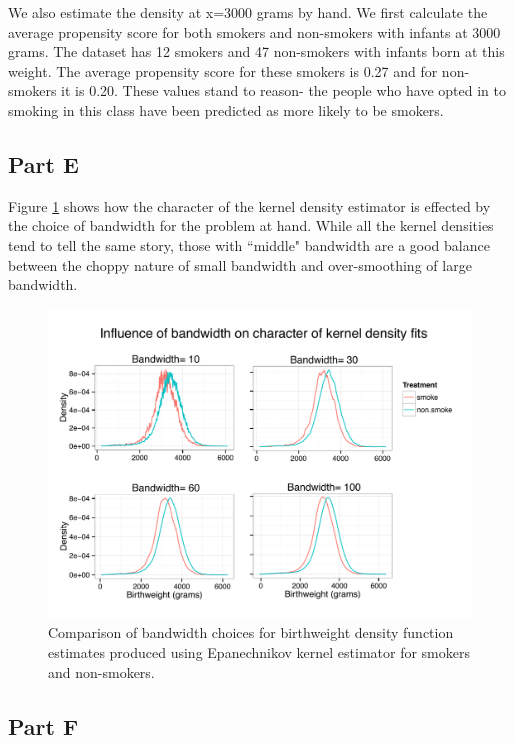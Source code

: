 \documentclass[letterpaper, 12pt]{article}
\begin{document}
We also estimate the density at x=3000 grams by hand. We first calculate the average propensity score for both smokers and non-smokers with infants at 3000 grams. The dataset has 12 smokers and 47 non-smokers with infants born at this weight. The average propensity score for these smokers is 0.27 and for non-smokers it is 0.20. These values stand to reason- the people who have opted in to smoking in this class have been predicted as more likely to be smokers.


\subsection{Part E}

Figure \ref{fig:kernelbw} shows how the character of the kernel density estimator is effected by the choice of bandwidth for the problem at hand.  While all the kernel densities tend to tell the same story, those with ``middle" bandwidth are a good balance between the choppy nature of small bandwidth and over-smoothing of large bandwidth.

\begin{figure}[h!]
   \centering
   \includegraphics[width=6in]{img/kdens-combinebw.pdf} 
   \caption{Comparison of bandwidth choices for birthweight density function estimates produced using Epanechnikov kernel estimator for smokers and non-smokers.}
   \label{fig:kernelbw}
\end{figure}

\subsection{Part F}
\end{document}
